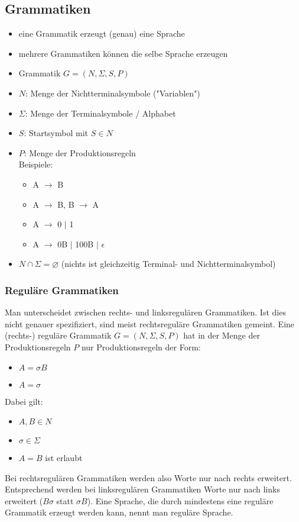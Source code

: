 \documentclass{article}
\begin{document}
	\subsection{Grammatiken}
	
	\begin{itemize}
		\item eine Grammatik erzeugt (genau) eine Sprache
		\item mehrere Grammatiken können die selbe Sprache erzeugen
		\item Grammatik $G = (N, \Sigma, S, P)$
		\item $N$: Menge der Nichtterminalsymbole ("Variablen")
		\item $\Sigma$: Menge der Terminalsymbole / Alphabet
		\item $S$: Startsymbol mit $S \in N$
		\item $P$: Menge der Produktionsregeln \\
		Beispiele:
		\begin{itemize}
			\item A $\rightarrow$ B
			\item A $\rightarrow$ B, B $\rightarrow$ A
			\item A $\rightarrow$ 0 $\mid$ 1
			\item A $\rightarrow$ 0B $\mid$ 100B $\mid$ $\epsilon$
		\end{itemize}
		\item $N \cap \Sigma = \varnothing$ (nichts ist gleichzeitig Terminal- und Nichtterminalsymbol)
	\end{itemize}
	
	\subsubsection{Reguläre Grammatiken}
	
	Man unterscheidet zwischen rechts- und linksregulären Grammatiken. Ist dies nicht genauer spezifiziert, sind meist rechtsreguläre Grammatiken gemeint. Eine (rechts-) reguläre Grammatik $G = (N, \Sigma, S, P)$ hat in der Menge der Produktionsregeln $P$ nur Produktionsregeln der Form:
	\begin{itemize}
		\item $A = \sigma B$
		\item $A = \sigma$
	\end{itemize}
	Dabei gilt: 
	\begin{itemize}
		\item $A, B \in N$
		\item $\sigma \in \Sigma$
		\item $A = B$ ist erlaubt
	\end{itemize}
	Bei rechtsregulären Grammatiken werden also Worte nur nach rechts erweitert. Entsprechend werden bei linksregulären Grammatiken Worte nur nach links erweitert ($B \sigma$ statt $\sigma B$). Eine Sprache, die durch mindestens eine reguläre Grammatik erzeugt werden kann, nennt man reguläre Sprache.
	
\end{document}
